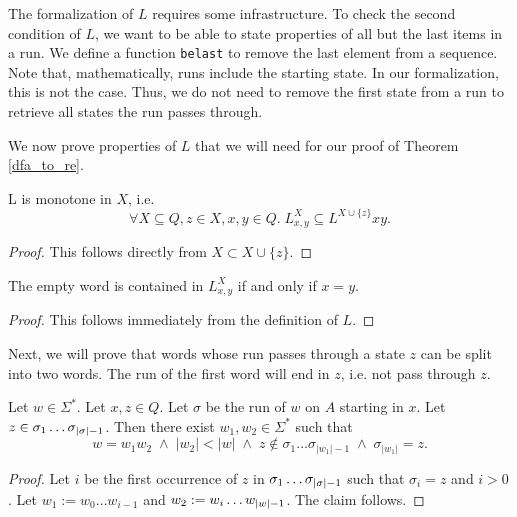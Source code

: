 The formalization of $L$ requires some infrastructure. 
To check the second condition of $L$, we want to be able to state properties of all but the last items in a run.
We define a function \lstinline{belast} to remove the last element from a sequence. 
Note that, mathematically, runs include the starting state.
In our formalization, this is not the case.
Thus, we do not need to remove the first state from a run to retrieve all states the run passes through.


We now prove properties of $L$ that we will need for our proof of Theorem \ref{dfa_to_re}.

\begin{lemma}
    \label{L_monotone}
    L is monotone in $X$, i.e.
    \begin{equation*}
        \forall X \subseteq Q, z \in X, x,y \in Q. \; L^X_{x,y} \subseteq L^{X\cup\{z\}} x y.
    \end{equation*}
\end{lemma}
\begin{proof}
    This follows directly from $X \subset X\cup\{z\}$.
\end{proof}


\begin{lemma}
    \label{L_nil}
    The empty word is contained in $L^X_{x,y}$ if and only if $x=y$.
\end{lemma}
\begin{proof}
   This follows immediately from the definition of $L$. 
\end{proof}


Next, we will prove that words whose run passes through a state $z$ can be split into two words. 
The run of the first word will end in $z$, i.e. not pass through $z$.

\begin{lemma}
    \label{run_split}
    Let $w \in \Sigma^*$. Let $x,z \in Q$. 
    Let $\sigma$ be the run of $w$ on $A$ starting in $x$.
    Let $z \in \sigma_1 \ldots {\sigma}_{|{\sigma}|-1}$.
    Then there exist $w_1, w_2 \in \Sigma^*$ such that
    \begin{equation*}
        w = w_1 w_2 \; \wedge \; |w_2| < |w| \; \wedge \; z \notin \sigma_1 \ldots \sigma_{|w_1|-1} \; \wedge \; \sigma_{|w_1|} = z.
    \end{equation*}
\end{lemma}
\begin{proof}
    Let $i$ be the first occurrence of $z$ in $\sigma_1 \dots {\sigma}_{|{\sigma}|-1}$ such that
    $\sigma_i = z$ and $i > 0$.
    Let $w_1 := w_0 \ldots w_{i-1}$ and $w_2 := w_i \ldots {w}_{|{w}|-1}$.
    The claim follows.
\end{proof}

